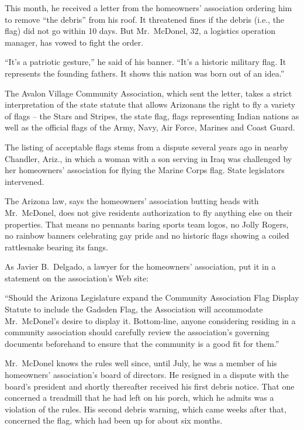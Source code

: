 ﻿\documentclass[12pt]{article}
\begin{document}
This month, he received a letter from the homeowners' association ordering him to remove ``the
debris'' from his roof. It threatened fines if the debris (i.e., the flag) did not go within 10
days. But Mr.~McDonel, 32, a logistics operation manager, has vowed to fight the order.

``It's a patriotic gesture,'' he said of his banner. ``It's a historic military flag. It represents
the founding fathers. It shows this nation was born out of an idea.''

The Avalon Village Community Association, which sent the letter, takes a strict interpretation of
the state statute that allows Arizonans the right to fly a variety of flags -- the Stars and
Stripes, the state flag, flags representing Indian nations as well as the official flags of the
Army, Navy, Air Force, Marines and Coast Guard.

The listing of acceptable flags stems from a dispute several years ago in nearby Chandler, Ariz., in
which a woman with a son serving in Iraq was challenged by her homeowners' association for flying
the Marine Corps flag. State legislators intervened.

The Arizona law, says the homeowners' association butting heads with Mr.~McDonel, does not give
residents authorization to fly anything else on their properties. That means no pennants baring
sports team logos, no Jolly Rogers, no rainbow banners celebrating gay pride and no historic flags
showing a coiled rattlesnake bearing its fangs.

As Javier B.~Delgado, a lawyer for the homeowners' association, put it in a statement on the
association's Web site:

``Should the Arizona Legislature expand the Community Association Flag Display Statute to include
the Gadsden Flag, the Association will accommodate Mr.~McDonel's desire to display it. Bottom-line,
anyone considering residing in a community association should carefully review the association's
governing documents beforehand to ensure that the community is a good fit for them.''

Mr.~McDonel knows the rules well since, until July, he was a member of his homeowners' association's
board of directors. He resigned in a dispute with the board's president and shortly thereafter
received his first debris notice. That one concerned a treadmill that he had left on his porch,
which he admits was a violation of the rules. His second debris warning, which came weeks after
that, concerned the flag, which had been up for about six months.
\end{document}
